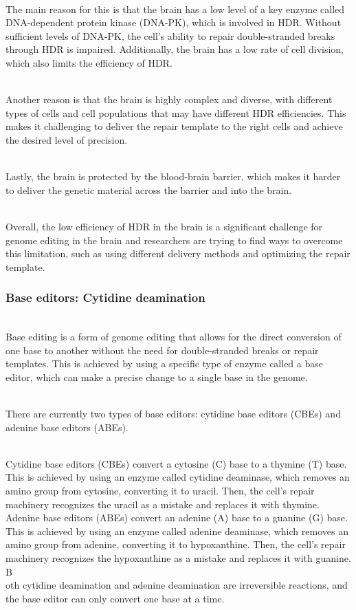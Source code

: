 \begin{itemize}
\begin{itemize}
\\The main reason for this is that the brain has a low level of a key enzyme called DNA-dependent protein kinase (DNA-PK), which is involved in HDR. Without sufficient levels of DNA-PK, the cell's ability to repair double-stranded breaks through HDR is impaired. Additionally, the brain has a low rate of cell division, which also limits the efficiency of HDR.

\\Another reason is that the brain is highly complex and diverse, with different types of cells and cell populations that may have different HDR efficiencies. This makes it challenging to deliver the repair template to the right cells and achieve the desired level of precision.

\\Lastly, the brain is protected by the blood-brain barrier, which makes it harder to deliver the genetic material across the barrier and into the brain.

\\Overall, the low efficiency of HDR in the brain is a significant challenge for genome editing in the brain and researchers are trying to find ways to overcome this limitation, such as using different delivery methods and optimizing the repair template.

\subsubsection{Base editors: Cytidine deamination}
\\Base editing is a form of genome editing that allows for the direct conversion of one base to another without the need for double-stranded breaks or repair templates. This is achieved by using a specific type of enzyme called a base editor, which can make a precise change to a single base in the genome.

\\There are currently two types of base editors: cytidine base editors (CBEs) and adenine base editors (ABEs).

\\Cytidine base editors (CBEs) convert a cytosine (C) base to a thymine (T) base. This is achieved by using an enzyme called cytidine deaminase, which removes an amino group from cytosine, converting it to uracil. Then, the cell's repair machinery recognizes the uracil as a mistake and replaces it with thymine.
\\Adenine base editors (ABEs) convert an adenine (A) base to a guanine (G) base. This is achieved by using an enzyme called adenine deaminase, which removes an amino group from adenine, converting it to hypoxanthine. Then, the cell's repair machinery recognizes the hypoxanthine as a mistake and replaces it with guanine.
B\\oth cytidine deamination and adenine deamination are irreversible reactions, and the base editor can only convert one base at a time.


\end{itemize}
\end{itemize}

